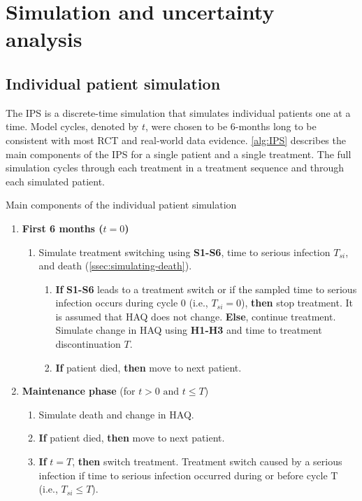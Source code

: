 \documentclass[11pt,final,fleqn]{article}
\theoremstyle{plain}
\begin{document}
\section{Simulation and uncertainty analysis}\label{sec:sim-uncertainty}

\subsection{Individual patient simulation}\label{individual-patient-simulation}

The IPS is a discrete-time simulation that simulates individual patients one at a time. Model cycles, denoted by $t$, were chosen to be 6-months long to be consistent with most RCT and real-world data evidence. \autoref{alg:IPS} describes the main components of the IPS for a single patient and a single treatment. The full simulation cycles through each treatment in a treatment sequence and through each simulated patient.

\begin{algorithm}
\caption{Main components of the individual patient simulation}
\label{alg:IPS}
\begin{enumerate}
\item \textbf{First 6 months ($t = 0$)}
\begin{enumerate}
\item Simulate treatment switching using \textbf{S1-S6}, time to serious infection $T_{si}$, and death (\autoref{ssec:simulating-death}).
\begin{enumerate}
\item \textbf{If} \textbf{S1-S6} leads to a treatment switch or if the sampled time to serious infection occurs during cycle 0 (i.e., $T_{si} = 0$), \textbf{then} stop treatment. It is assumed that HAQ does not change.
\newline \textbf{Else}, continue treatment. Simulate change in HAQ using \textbf{H1-H3} and time to treatment discontinuation $T$.
\item \textbf{If} patient died, \textbf{then} move to next patient. 
\end{enumerate}
\end{enumerate}
\item \textbf{Maintenance phase} (for $t > 0 \text{ and } t \leq T$)
\begin{enumerate}
\item Simulate death and change in HAQ.
\item \textbf{If} patient died, \textbf{then} move to next patient.
\item \textbf{If} $t = T$, \textbf{then} switch treatment. Treatment switch caused by a serious infection if time to serious infection occurred during or before cycle T (i.e., $T_{si} \leq T$). 
\end{enumerate}
\end{enumerate}
\end{algorithm}
\end{document}
